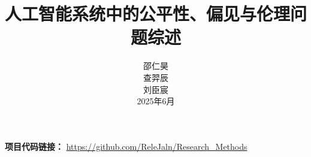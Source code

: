 \documentclass[10pt,twocolumn,letterpaper]{article}
\title{人工智能系统中的公平性、偏见与伦理问题综述}
\author{
	邵仁昊 \\
	查羿辰 \\
	刘臣宸  \\
	2025年6月 
}
\begin{document}
	\maketitle
	
	
	{
		\small
		
		
	}
	\vspace{1em}
	\noindent\textbf{项目代码链接：} \url{https://github.com/ReleJaln/Research_Methods}
\end{document}
